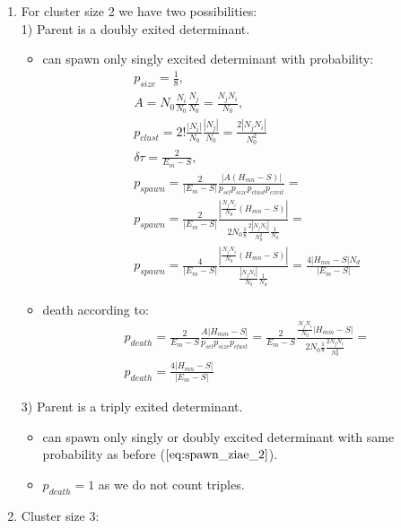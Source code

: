 \documentclass[twoside,english]{uiofysmaster}
\theoremstyle{definition}
\begin{document}
\begin{enumerate}
\item For cluster size 2 we have two possibilities:\\
1) Parent is a doubly exited determinant.
\begin{itemize}
	\item can spawn only singly excited determinant with probability:
\begin{align}
p_{size} = \frac{1}{8},\\
A = N_0\frac{N_i}{N_0}\frac{N_j}{N_0}=\frac{N_jN_i}{N_0},\\
p_{clust}=2!\frac{|N_i|}{N_0}\frac{|N_j|}{N_0}=\frac{2|N_jN_i|}{N_0^2}\\
\delta \tau = \frac{2}{E_m  - S},\\
p_{spawn} = \frac{2}{|E_m - S|} \frac{|A(H_{mn}-S)|}{ p_{sel}  p_{size} p_{clust} p_{excit}  }=\\
p_{spawn} = \frac{2}{|E_m - S|} \frac{  | \frac{N_jN_i}{N_0} (H_{mn}-S)|}{2N_0 \frac{1}{8} \frac{2|N_jN_i|}{N_0^2} \frac{1}{N_d} }=\\
p_{spawn} = \frac{4}{|E_m - S|} \frac{ |\frac{N_jN_i}{N_0} (H_{mn}-S)|}{ \frac{|N_jN_i|}{N_0} \frac{1}{N_d} }=\frac{4|H_{mn}-S|N_d}{|E_m - S|}\label{eq:spawn_ziae_2}
\end{align}
	\item death according to:
\begin{align}
	p_{death} = \frac{2}{E_m - S} \frac{A|H_{mm}-S|}{ p_{sel}  p_{size} p_{clust} }=
	 \frac{2}{E_m - S} \frac{\frac{N_jN_i}{N_0}|H_{mm}-S|}{ 2N_0 \frac{1}{8} \frac{2N_jN_i}{N_0^2} }=\\
	 p_{death} =  \frac{4|H_{mn}-S|}{|E_m - S|}
\end{align}
\end{itemize}
3) Parent is a triply exited determinant.
\begin{itemize}
	\item can spawn only singly or doubly excited determinant with same probability as before ($\ref{eq:spawn_ziae_2}$).
	\item $p_{death} = 1$ as we do not count triples.
\end{itemize}

\item Cluster size 3:


\end{enumerate}
\end{document}
